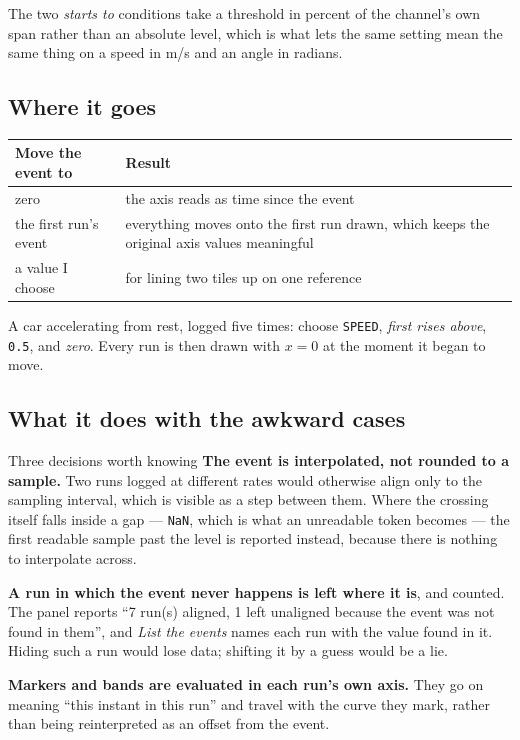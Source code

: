 \documentclass[11pt,a4paper,oneside]{report}
\newcommand{\code}[1]{\texttt{#1}}
\begin{document}
The two \emph{starts to} conditions take a threshold in percent of the
channel's own span rather than an absolute level, which is what lets the same
setting mean the same thing on a speed in m/s and an angle in radians.

\subsection*{Where it goes}

\begin{longtable}{@{}p{}p{}@{}}
\toprule
\textbf{Move the event to} & \textbf{Result} \\
\midrule
\endhead
zero & the axis reads as time since the event \\
the first run's event & everything moves onto the first run drawn, which keeps
the original axis values meaningful \\
a value I choose & for lining two tiles up on one reference \\
\bottomrule
\end{longtable}

A car accelerating from rest, logged five times: choose \code{SPEED},
\emph{first rises above}, \code{0.5}, and \emph{zero}. Every run is then drawn
with $x = 0$ at the moment it began to move.

\subsection*{What it does with the awkward cases}

\begin{aoenote}{Three decisions worth knowing}
\textbf{The event is interpolated, not rounded to a sample.} Two runs logged at
different rates would otherwise align only to the sampling interval, which is
visible as a step between them. Where the crossing itself falls inside a gap
--- \code{NaN}, which is what an unreadable token becomes --- the first
readable sample past the level is reported instead, because there is nothing to
interpolate across.

\textbf{A run in which the event never happens is left where it is}, and
counted. The panel reports ``7 run(s) aligned, 1 left unaligned because the
event was not found in them'', and \emph{List the events} names each run with
the value found in it. Hiding such a run would lose data; shifting it by a
guess would be a lie.

\textbf{Markers and bands are evaluated in each run's own axis.} They go on
meaning ``this instant in this run'' and travel with the curve they mark,
rather than being reinterpreted as an offset from the event.
\end{aoenote}
\end{document}
